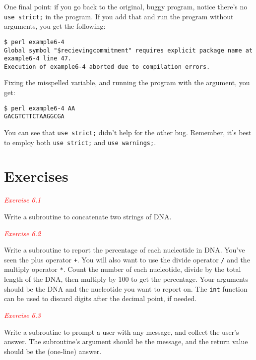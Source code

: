 One final point: if you go back to the original, buggy program, notice there's no \verb|use strict;| in the program. If you add that and run the program without arguments, you get the following: 

\begin{lstlisting}
$ perl example6-4   
Global symbol "$recievingcommitment" requires explicit package name at example6-4 line 47.
Execution of example6-4 aborted due to compilation errors.
\end{lstlisting}

Fixing the misspelled variable, and running the program with the argument, you get:

\begin{lstlisting}
$ perl example6-4 AA
GACGTCTTCTAAGGCGA
\end{lstlisting}

You can see that \verb|use strict;| didn't help for the other bug. Remember, it's best to employ both \verb|use strict;| and \verb|use warnings;|.

\section{Exercises}
\textcolor{red}{\textit{Exercise 6.1}}
\begin{adjustwidth}{1cm}{}
Write a subroutine to concatenate two strings of DNA.
\end{adjustwidth}

\textcolor{red}{\textit{Exercise 6.2}}
\begin{adjustwidth}{1cm}{}
Write a subroutine to report the percentage of each nucleotide in DNA.  You've seen the plus operator \verb|+|. You will also want to use the divide operator \verb|/| and the multiply operator \verb|*|. Count the number of each nucleotide, divide by the total length of the DNA, then multiply by 100 to get the percentage. Your arguments should be the DNA and the nucleotide you want to report on. The \verb|int| function can be used to discard digits after the decimal point, if needed.
\end{adjustwidth}

\textcolor{red}{\textit{Exercise 6.3}}
\begin{adjustwidth}{1cm}{}
Write a subroutine to prompt a user with any message, and collect the user's answer. The subroutine's argument should be the message, and the return value should be the (one-line) answer. 
\end{adjustwidth}

